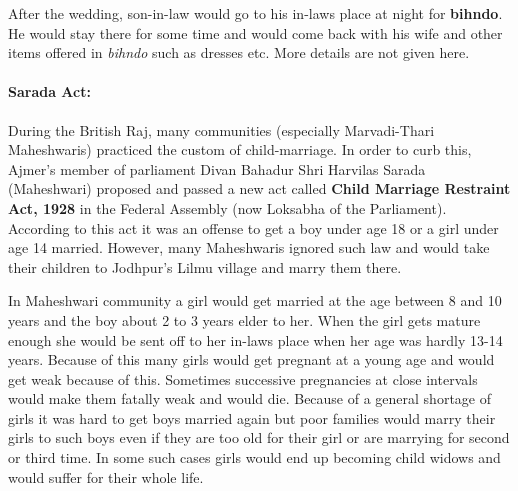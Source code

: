 After the wedding, son-in-law would go to his in-laws place at night for
\textbf{bihndo}. He would stay there for some time and would come back with his
wife and other items offered in \textit{bihndo} such as dresses etc. More
details are not given here.

\par
\begin{center} \par\end{center}
\paragraph{Sarada Act:} During the British Raj, many communities (especially
Marvadi-Thari Maheshwaris) practiced  the custom of child-marriage. In
order to curb this, Ajmer's member of parliament Divan Bahadur Shri Harvilas
Sarada (Maheshwari) proposed and passed a new act called \textbf{Child Marriage
Restraint Act, 1928} in the Federal Assembly (now Loksabha of the
Parliament). According to this act it was an offense to get a boy
under age 18 or a girl under age 14 married. However, many Maheshwaris
ignored such law and would take their children to Jodhpur's Lilmu village
and marry them there.

In Maheshwari community a girl would get married at the age between 8 and 10
years and the boy about 2 to 3 years elder to her. When the girl gets mature
enough she would be sent off to her in-laws place when her age was hardly 13-14
years. Because of this many girls would get pregnant at a young age and would
get weak because of this. Sometimes successive pregnancies at close intervals
would make them fatally weak and would die. Because of a general shortage of
girls it was hard to get boys married again but poor families would marry their
girls to such boys even if they are too old for their girl or are marrying for
second or third time. In some such cases girls would end up becoming child
widows and would suffer for their whole life.

